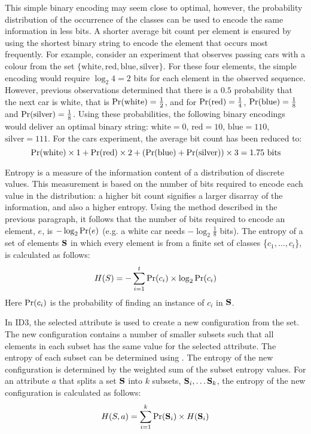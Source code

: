 \documentclass[twoside,11pt]{article}
\begin{document}
This simple binary encoding may seem close to optimal, however, the probability distribution of the occurrence of the classes can be used to encode the same information in less bits. A shorter average bit count per element is ensured by using the shortest binary string to encode the element that occurs most frequently. For example, consider an experiment that observes passing cars with a colour from the set  $\{\mbox{white},\mbox{red},\mbox{blue},\mbox{silver}\}$.  For these four elements, the simple encoding would require $\log_2{4} = 2$ bits for each element in the observed sequence. However, previous observations determined that there is a $0.5$ probability that the next car is white, that is $\mbox{Pr}(\mbox{white}) = \frac{1}{2}$, and for $\mbox{Pr}(\mbox{red}) = \frac{1}{4}$, $\mbox{Pr}(\mbox{blue}) = \frac{1}{8}$ and $\mbox{Pr}(\mbox{silver}) = \frac{1}{8}$. Using these probabilities, the following binary encodings would deliver an optimal binary string: $\mbox{white} = 0$, $\mbox{red}=10$, $\mbox{blue}=110$, $\mbox{silver}=111$.   For the cars experiment, the average bit count has been reduced to:
\[
	\mbox{Pr}(\mbox{white}) \times 1 + 
	\mbox{Pr}(\mbox{red}) \times 2 + 
	(\mbox{Pr}(\mbox{blue}) + \mbox{Pr}(\mbox{silver})) \times 3 = 1.75 \mbox{ bits}
\] 

Entropy is a measure of the information content of a distribution of discrete values. This measurement is based on the number of bits required to encode each value in the distribution: a higher bit count signifies a larger disarray of the information, and also a higher entropy.  Using the method described in the previous paragraph, it follows that the number of bits required to encode an element, $e$, is $-\log_2{\mbox{Pr}(e)}$ (e.g. a white car needs $-\log_2{\frac{1}{8}}$ bits). The entropy of a set of elements ${\bf S}$ in which every element is from a finite set of classes \{$c_1, \ldots, c_t$\}, is calculated as follows:
\begin{equation}
H(S) = - \sum_{i=1}^{t}{\mbox{Pr}(c_i) \times  \log_2{\mbox{Pr}(c_i)}}
\label{eq:entropy}
\end{equation}
Here $\mbox{Pr}(c_i)$ is the probability of finding an instance of $c_i$ in ${\bf S}$.  

In ID3, the selected attribute is used to create a new configuration from the set.  The new configuration contains a number of smaller subsets such that all elements in each subset has the same value for the selected attribute. The entropy of each subset can be determined using .  The entropy of the new configuration is determined by the weighted sum of the subset entropy values. For an attribute $a$ that splits a set ${\bf S}$ into $k$ subsets, ${\bf S}_i, \ldots {\bf S}_k$, the entropy of the new configuration is calculated as follows:
\begin{equation}
H(S,a) = \sum_{i=1}^{k}{\mbox{Pr}({\bf S}_i) \times H({\bf S}_i)}
\label{eq:attrib_entropy}
\end{equation}
\end{document}

